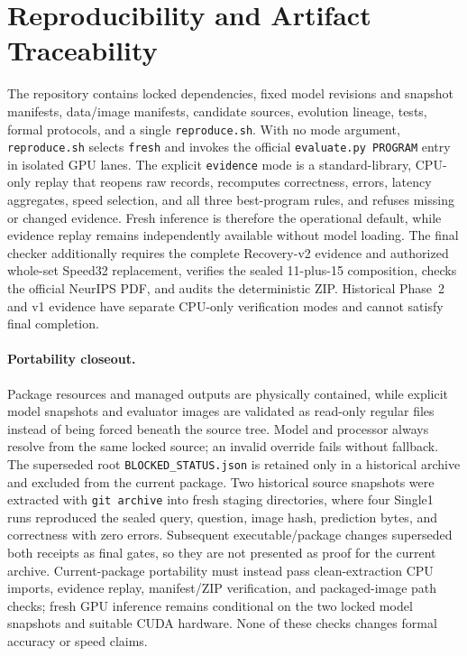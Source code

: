 \documentclass{article}
\begin{document}
\section{Reproducibility and Artifact Traceability}
The repository contains locked dependencies, fixed model revisions and snapshot
manifests, data/image manifests, candidate sources, evolution lineage, tests,
formal protocols, and a single \texttt{reproduce.sh}. With no mode argument,
\texttt{reproduce.sh} selects \texttt{fresh} and invokes the official
\texttt{evaluate.py PROGRAM} entry in isolated GPU lanes. The explicit
\texttt{evidence} mode is a standard-library, CPU-only replay that reopens raw records,
recomputes correctness, errors, latency aggregates, speed selection, and all
three best-program rules, and refuses missing or changed evidence. Fresh inference
is therefore the operational default, while evidence replay remains independently
available without model loading. The final checker additionally requires the complete
Recovery-v2 evidence and authorized whole-set Speed32 replacement, verifies the sealed
11-plus-15 composition, checks the official NeurIPS PDF, and audits the deterministic ZIP.
Historical Phase~2 and v1 evidence have separate CPU-only verification modes and
cannot satisfy final completion.

\paragraph{Portability closeout.}
Package resources and managed outputs are physically contained, while explicit
model snapshots and evaluator images are validated as read-only regular files
instead of being forced beneath the source tree. Model and processor always
resolve from the same locked source; an invalid override fails without fallback.
The superseded root \texttt{BLOCKED\_STATUS.json} is retained only in a historical
archive and excluded from the current package. Two historical source snapshots
were extracted with \texttt{git archive} into fresh staging directories, where
four Single1 runs reproduced the sealed query, question, image hash, prediction
bytes, and correctness with zero errors. Subsequent executable/package changes
superseded both receipts as final gates, so they are not presented as proof for
the current archive. Current-package portability must instead pass clean-extraction
CPU imports, evidence replay, manifest/ZIP verification, and packaged-image path
checks; fresh GPU inference remains conditional on the two locked model snapshots
and suitable CUDA hardware. None of these checks changes formal accuracy or speed
claims.
\end{document}
